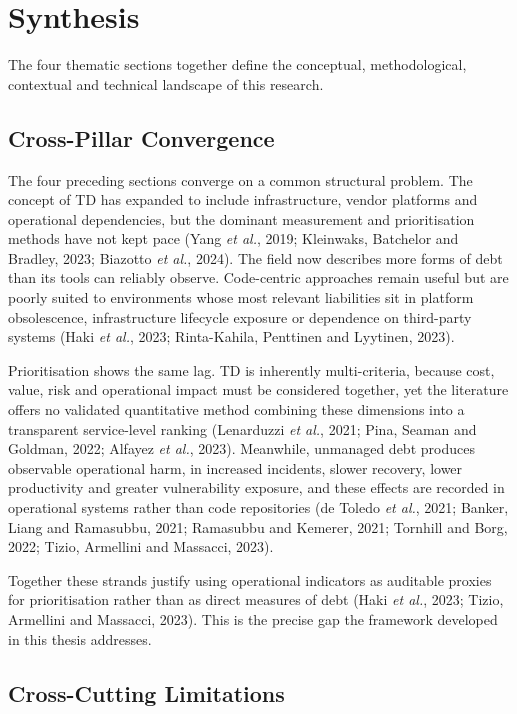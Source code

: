 \documentclass[
  12pt,
  letterpaper,
  12pt,
  oneside,
  english,
  onehalfspacing,
  headsepline]{MastersDoctoralThesis}
\begin{document}
\section{Synthesis}\label{synthesis}

The four thematic sections together define the conceptual,
methodological, contextual and technical landscape of this research.

\subsection{Cross-Pillar Convergence}\label{cross-pillar-convergence}

The four preceding sections converge on a common structural problem. The
concept of TD has expanded to include infrastructure, vendor platforms
and operational dependencies, but the dominant measurement and
prioritisation methods have not kept pace (Yang \emph{et al.}, 2019;
Kleinwaks, Batchelor and Bradley, 2023; Biazotto \emph{et al.}, 2024).
The field now describes more forms of debt than its tools can reliably
observe. Code-centric approaches remain useful but are poorly suited to
environments whose most relevant liabilities sit in platform
obsolescence, infrastructure lifecycle exposure or dependence on
third-party systems (Haki \emph{et al.}, 2023; Rinta-Kahila, Penttinen
and Lyytinen, 2023).

Prioritisation shows the same lag. TD is inherently multi-criteria,
because cost, value, risk and operational impact must be considered
together, yet the literature offers no validated quantitative method
combining these dimensions into a transparent service-level ranking
(Lenarduzzi \emph{et al.}, 2021; Pina, Seaman and Goldman, 2022; Alfayez
\emph{et al.}, 2023). Meanwhile, unmanaged debt produces observable
operational harm, in increased incidents, slower recovery, lower
productivity and greater vulnerability exposure, and these effects are
recorded in operational systems rather than code repositories (de Toledo
\emph{et al.}, 2021; Banker, Liang and Ramasubbu, 2021; Ramasubbu and
Kemerer, 2021; Tornhill and Borg, 2022; Tizio, Armellini and Massacci,
2023).

Together these strands justify using operational indicators as auditable
proxies for prioritisation rather than as direct measures of debt (Haki
\emph{et al.}, 2023; Tizio, Armellini and Massacci, 2023). This is the
precise gap the framework developed in this thesis addresses.

\subsection{Cross-Cutting Limitations}\label{cross-cutting-limitations}
\end{document}
